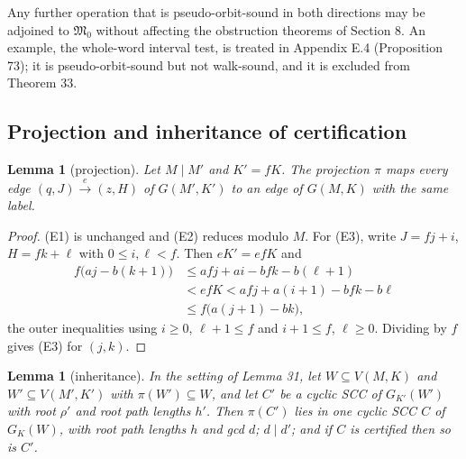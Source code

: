 \documentclass[11pt,reqno]{amsart}
\newtheorem{lemma}[theorem]{Lemma}
\theoremstyle{definition}
\theoremstyle{remark}
\begin{document}
Any further operation that is pseudo-orbit-sound in both directions may
be adjoined to \(\mathfrak M_0\) without affecting the obstruction
theorems of Section 8. An example, the whole-word interval test, is treated in Appendix E.4
(Proposition 73); it is pseudo-orbit-sound but not walk-sound, and it is
excluded from Theorem 33.

\subsection{Projection and inheritance of certification}\label{sec:7.3}

\begin{samepage}
\begin{lemma}[projection]\leavevmode\label{thm:31}
Let \(M\mid M'\) and \(K'=fK\). The
projection \(\pi\) maps every edge \((q,J)\xrightarrow{e}(z,H)\) of
\(G(M',K')\) to an edge of \(G(M,K)\) with the same label.
\label{thm-end:31}
\end{lemma}
\end{samepage}

\begin{proof}\leavevmode\label{proof:31}
(E1) is unchanged and (E2) reduces modulo \(M\). For (E3),
write \(J=fj+i\), \(H=fk+\ell\) with \(0\le i,\ell<f\). Then
\(eK'=efK\)
and
\[
\begin{aligned}
f\bigl(aj-b(k+1)\bigr)&\le afj+ai-bfk-b(\ell+1)\\
&<efK<afj+a(i+1)-bfk-b\ell\\
&\le f\bigl(a(j+1)-bk\bigr),
\end{aligned}
\]
the outer inequalities using \(i\ge0\), \(\ell+1\le f\) and
\(i+1\le f\), \(\ell\ge0\). Dividing by \(f\) gives (E3) for
\((j,k)\). \qedhere
\end{proof}

\begin{samepage}
\begin{lemma}[inheritance]\leavevmode\label{thm:32}
In the setting of Lemma 31, let
\(W\subseteq V(M,K)\) and \(W'\subseteq V(M',K')\) with
\(\pi(W')\subseteq W\), and let \(C'\) be a cyclic SCC of \(G_{K'}(W')\)
with root \(\rho'\) and root path lengths \(h'\). Then \(\pi(C')\) lies
in one cyclic SCC \(C\) of \(G_K(W)\), with root path lengths \(h\) and
gcd \(d\); \(d\mid d'\); and if \(C\) is certified then so is \(C'\).
\label{thm-end:32}
\end{lemma}
\end{samepage}
\end{document}
